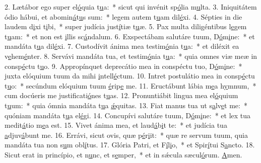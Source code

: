 2. Lætábor ego super el\uline{ó}quia t\uline{u}a:~* sicut qui invénit sp\uline{ó}lia m\uline{u}lta.
3. Iniquitátem ódio hábui, et abomin\uline{á}t\uline{u}s sum:~* legem autem t\uline{u}am dil\uline{é}xi.
4. Sépties in die laudem d\uline{i}xi t\uline{i}bi,~* super judícia just\uline{í}tiæ t\uline{u}æ.
5. Pax multa diligéntibus l\uline{e}gem t\uline{u}am:~* et non est \uline{i}llis sc\uline{á}ndalum.
6. Exspectábam salutáre tuum, D\uline{ó}m\uline{i}ne:~* et mandáta t\uline{u}a dil\uline{é}xi.
7. Custodívit ánima mea testim\uline{ó}nia t\uline{u}a:~* et diléxit ea v\uline{e}hem\uline{é}nter.
8. Servávi mandáta tua, et testim\uline{ó}nia t\uline{u}a:~* quia omnes viæ meæ in consp\uline{é}ctu t\uline{u}o.
9. Appropínquet deprecátio mea in conspéctu tuo, D\uline{ó}m\uline{i}ne:~* juxta elóquium tuum da mihi \uline{i}ntell\uline{é}ctum.
10. Intret postulátio mea in consp\uline{é}ctu t\uline{u}o:~* secúndum elóquium tuum \uline{é}rip\uline{e} me.
11. Eructábunt lábia m\uline{e}a h\uline{y}mnum,~* cum docúeris me justificati\uline{ó}nes t\uline{u}as.
12. Pronuntiábit lingua mea el\uline{ó}quium t\uline{u}um:~* quia ómnia mandáta t\uline{u}a \uline{ǽ}quitas.
13. Fiat manus tua ut s\uline{a}lv\uline{e}t me:~* quóniam mandáta t\uline{u}a el\uline{é}gi.
14. Concupívi salutáre tuum, D\uline{ó}m\uline{i}ne:~* et lex tua medit\uline{á}tio m\uline{e}a est.
15. Vivet ánima mea, et laud\uline{á}b\uline{i}t te:~* et judícia tua \uline{a}djuv\uline{á}bunt me.
16. Errávi, sicut ovis, quæ p\uline{é}r\uline{i}it:~* quæ re servum tuum, quia mandáta tua non s\uline{u}m obl\uline{í}tus.
17. Glória Patri, et F\uline{í}l\uline{i}o,~* et Spir\uline{í}tui S\uline{a}ncto.
18. Sicut erat in princípio, et n\uline{u}nc, et s\uline{e}mper,~* et in sǽcula sæcul\uline{ó}rum. \uline{A}men.

